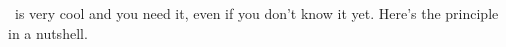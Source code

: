 \antioch\ is very cool and you need it, even if you don't
know it yet. Here's the principle in a nutshell.
